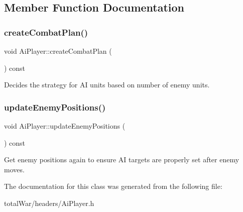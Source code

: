 \subsection{Member Function Documentation}
\mbox{\label{class_ai_player_a013d269c314ff5a9158e51ec92633b3c}} 
\subsubsection{\texorpdfstring{create\+Combat\+Plan()}{createCombatPlan()}}
{\footnotesize\ttfamily void Ai\+Player\+::create\+Combat\+Plan (\begin{DoxyParamCaption}{ }\end{DoxyParamCaption}) const}

Decides the strategy for AI units based on number of enemy units. \mbox{\label{class_ai_player_aa134aabc87dfad1324823c357430ddec}} 
\subsubsection{\texorpdfstring{update\+Enemy\+Positions()}{updateEnemyPositions()}}
{\footnotesize\ttfamily void Ai\+Player\+::update\+Enemy\+Positions (\begin{DoxyParamCaption}{ }\end{DoxyParamCaption}) const}

Get enemy positions again to ensure AI targets are properly set after enemy moves. 

The documentation for this class was generated from the following file\+:\begin{DoxyCompactItemize}
\item 
total\+War/headers/Ai\+Player.\+h\end{DoxyCompactItemize}
